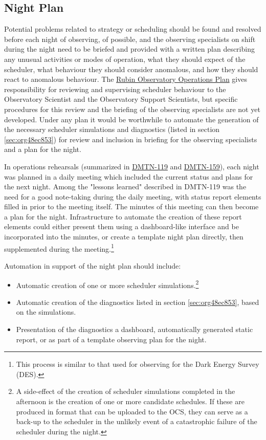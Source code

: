 \subsection{Night Plan}
\label{sec:orgfd0a8a8}

Potential problems related to strategy or scheduling should be found and resolved before each night of observing, of possible, and the observing specialists on shift during the night need to be briefed and provided with a written plan describing any unusual activities or modes of operation, what they should expect of the scheduler, what behaviour they should consider anomalous, and how they should react to anomalous behaviour.
The \href{https://docushare.lsst.org/docushare/dsweb/Get/Document-36797/Rubin\%20Observatory\%20Operations\%20Plan\%20April\%202020.pdf}{Rubin Observatory Operations Plan} gives responsibility for reviewing and supervising scheduler behaviour to the Observatory Scientist and the Observatory Support Scientists, but specific procedures for this review and the briefing of the observing specialists are not yet developed.
Under any plan it would be worthwhile to automate the generation of the necessary scheduler simulations and diagnostics (listed in section \ref{sec:org48ec853}) for review and inclusion in briefing for the observing specialists and a plan for the night.

In operations rehearsals (summarized in \href{https://dmtn-119.lsst.io}{DMTN-119} and \href{https://dmtn-159.lsst.io/}{DMTN-159}), each night was planned in a daily meeting which included the current status and plans for the next night.
Among the "lessons learned" described in DMTN-119 was the need for a good note-taking during the daily meeting, with status report elements filled in prior to the meeting itself. 
The minutes of this meeting can then become a plan for the night.
Infrastructure to automate the creation of these report elements could either present them using a dashboard-like interface and be incorporated into the minutes, or create a template night plan directly, then supplemented during the meeting.\footnote{This process is similar to that used for observing for the Dark Energy Survey (DES).}

Automation in support of the night plan should include:
\begin{itemize}
\item Automatic creation of one or more scheduler simulations.\footnote{A side-effect of the creation of scheduler simulations completed in the afternoon is the creation of one or more candidate schedules. If these are produced in format that can be uploaded to the OCS, they can serve as a back-up to the scheduler in the unlikely event of a catastrophic failure of the scheduler during the night.}
\item Automatic creation of the diagnostics listed in section \ref{sec:org48ec853}, based on the simulations.
\item Presentation of the diagnostics a dashboard, automatically generated static report, or as part of a template observing plan for the night.
\end{itemize}

